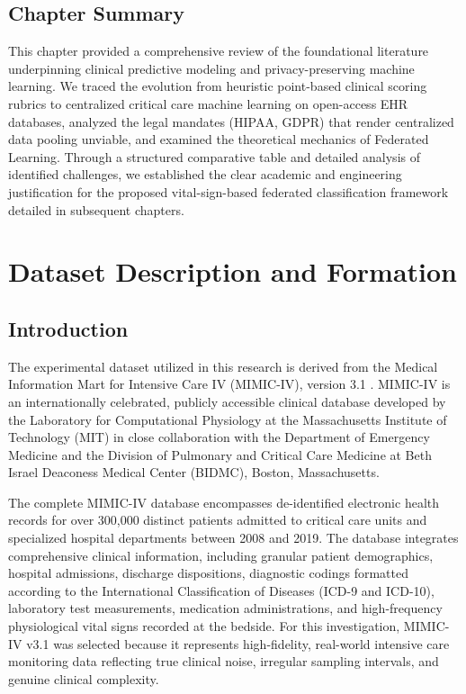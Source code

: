 \documentclass[12pt,a4paper,oneside]{report}
\begin{document}
\section{Chapter Summary}
\label{sec:chapter2_summary}

This chapter provided a comprehensive review of the foundational literature underpinning clinical predictive modeling and privacy-preserving machine learning. We traced the evolution from heuristic point-based clinical scoring rubrics to centralized critical care machine learning on open-access EHR databases, analyzed the legal mandates (HIPAA, GDPR) that render centralized data pooling unviable, and examined the theoretical mechanics of Federated Learning. Through a structured comparative table and detailed analysis of identified challenges, we established the clear academic and engineering justification for the proposed vital-sign-based federated classification framework detailed in subsequent chapters.


\chapter{Dataset Description and Formation}
\label{ch:dataset}

\section{Introduction}
\label{sec:dataset_intro}

The experimental dataset utilized in this research is derived from the Medical Information Mart for Intensive Care IV (MIMIC-IV), version 3.1 \citep{johnson2023mimic}. MIMIC-IV is an internationally celebrated, publicly accessible clinical database developed by the Laboratory for Computational Physiology at the Massachusetts Institute of Technology (MIT) in close collaboration with the Department of Emergency Medicine and the Division of Pulmonary and Critical Care Medicine at Beth Israel Deaconess Medical Center (BIDMC), Boston, Massachusetts. 

The complete MIMIC-IV database encompasses de-identified electronic health records for over 300,000 distinct patients admitted to critical care units and specialized hospital departments between 2008 and 2019. The database integrates comprehensive clinical information, including granular patient demographics, hospital admissions, discharge dispositions, diagnostic codings formatted according to the International Classification of Diseases (ICD-9 and ICD-10), laboratory test measurements, medication administrations, and high-frequency physiological vital signs recorded at the bedside. For this investigation, MIMIC-IV v3.1 was selected because it represents high-fidelity, real-world intensive care monitoring data reflecting true clinical noise, irregular sampling intervals, and genuine clinical complexity.
\end{document}
